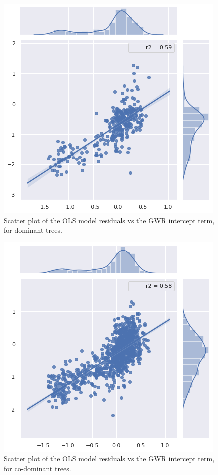 \documentclass[12pt,a4paper]{article}
\begin{document}
\begin{figure}[H]
\centering
\includegraphics[scale=.65]{../figures/ModelComparison_Cnpy=2.png}
\caption{Scatter plot of the OLS model residuals vs the GWR intercept term, for dominant trees.}
\label{ModelComparison_Cnpy2} 
\end{figure}

\begin{figure}[H]
\centering
\includegraphics[scale=.65]{../figures/ModelComparison_Cnpy=3.png}
\caption{Scatter plot of the OLS model residuals vs the GWR intercept term, for co-dominant trees.}
\label{ModelComparison_Cnpy3} 
\end{figure}
\end{document}

